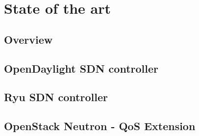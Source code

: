 \chapter{State of the art}

\section{Overview}

\section{OpenDaylight SDN controller}

\section{Ryu SDN controller}

\section{OpenStack Neutron - QoS Extension}